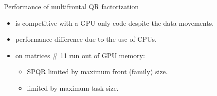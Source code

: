 \begin{frame}{Performance of multifrontal QR factorization}
\begin{center}
  \end{center}

  \begin{itemize}
  \item \qrm is competitive with a \alert{GPU-only} code despite the
    data movements.
  \item performance difference due to the use of CPUs.
  \item on matrices \# 11 \spqr run out of GPU memory:
    \begin{itemize}
    \item SPQR limited by maximum front (family) size.
    \item \qrm limited by maximum task size.
    \end{itemize}
  \end{itemize}

\end{frame}

